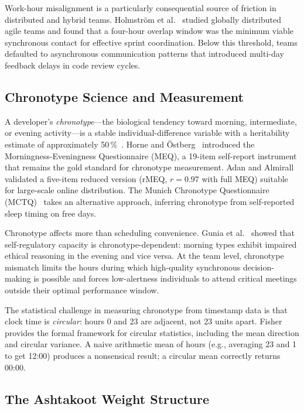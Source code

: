 \documentclass[conference]{IEEEtran}
\begin{document}
Work-hour misalignment is a particularly consequential source of
friction in distributed and hybrid teams.  Holmstr\"{o}m et
al.~\cite{holmstrom2006} studied globally distributed agile teams
and found that a four-hour overlap window was the minimum viable
synchronous contact for effective sprint coordination.  Below this
threshold, teams defaulted to asynchronous communication patterns
that introduced multi-day feedback delays in code review cycles.

\subsection{Chronotype Science and Measurement}

A developer's \textit{chronotype}---the biological tendency toward
morning, intermediate, or evening activity---is a stable
individual-difference variable with a heritability estimate of
approximately 50\,\%~\cite{roenneberg2003}.  Horne and
\"{O}stberg~\cite{horne1976} introduced the Morningness-Eveningness
Questionnaire (MEQ), a 19-item self-report instrument that remains
the gold standard for chronotype measurement.  Adan and
Almirall~\cite{adan1991} validated a five-item reduced version
(rMEQ, $r = 0.97$ with full MEQ) suitable for large-scale online
distribution.  The Munich Chronotype Questionnaire
(MCTQ)~\cite{roenneberg2003} takes an alternative approach, inferring
chronotype from self-reported sleep timing on free days.

Chronotype affects more than scheduling convenience.  Gunia et
al.~\cite{gunia2014} showed that self-regulatory capacity is
chronotype-dependent: morning types exhibit impaired ethical
reasoning in the evening and vice versa.  At the team level,
chronotype mismatch limits the hours during which high-quality
synchronous decision-making is possible and forces low-alertness
individuals to attend critical meetings outside their optimal
performance window.

The statistical challenge in measuring chronotype from timestamp
data is that clock time is \textit{circular}: hours 0 and 23 are
adjacent, not 23 units apart.  Fisher~\cite{fisher1993} provides the
formal framework for circular statistics, including the mean direction
and circular variance.  A naive arithmetic mean of hours (e.g.,
averaging 23 and 1 to get 12:00) produces a nonsensical result;
a circular mean correctly returns 00:00.

\subsection{The Ashtakoot Weight Structure}
\end{document}
